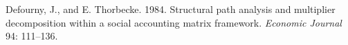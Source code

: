 
\begin{list}{}{\setlength{\leftmargin}{2em}\setlength{\itemindent}{-2em}%
  \setlength{\itemsep}{2pt}\setlength{\parsep}{0pt}}
\item Defourny, J., and E. Thorbecke. 1984. Structural path analysis and
multiplier decomposition within a social accounting matrix framework.
\textit{Economic Journal} 94: 111--136.
\end{list}


\begin{alsosee}
\end{alsosee}
